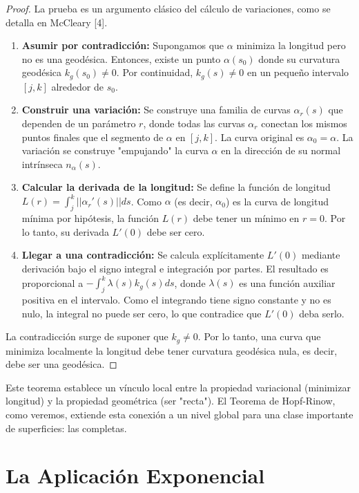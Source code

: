 \documentclass[12pt, a4paper]{report}
\theoremstyle{miestilo}
\theoremstyle{midefinicion}
\begin{document}
\begin{proof}
La prueba es un argumento clásico del cálculo de variaciones, como se detalla en McCleary [4].
\begin{enumerate}
    \item \textbf{Asumir por contradicción:} Supongamos que $\alpha$ minimiza la longitud pero no es una geodésica. Entonces, existe un punto $\alpha(s_0)$ donde su curvatura geodésica $k_g(s_0) \neq 0$. Por continuidad, $k_g(s) \neq 0$ en un pequeño intervalo $[j,k]$ alrededor de $s_0$.
    \item \textbf{Construir una variación:} Se construye una familia de curvas $\alpha_r(s)$ que dependen de un parámetro $r$, donde todas las curvas $\alpha_r$ conectan los mismos puntos finales que el segmento de $\alpha$ en $[j,k]$. La curva original es $\alpha_0 = \alpha$. La variación se construye "empujando" la curva $\alpha$ en la dirección de su normal intrínseca $n_\alpha(s)$.
    \item \textbf{Calcular la derivada de la longitud:} Se define la función de longitud $L(r) = \int_j^k ||\alpha_r'(s)|| ds$. Como $\alpha$ (es decir, $\alpha_0$) es la curva de longitud mínima por hipótesis, la función $L(r)$ debe tener un mínimo en $r=0$. Por lo tanto, su derivada $L'(0)$ debe ser cero.
    \item \textbf{Llegar a una contradicción:} Se calcula explícitamente $L'(0)$ mediante derivación bajo el signo integral e integración por partes. El resultado es proporcional a $-\int_j^k \lambda(s) k_g(s) ds$, donde $\lambda(s)$ es una función auxiliar positiva en el intervalo. Como el integrando tiene signo constante y no es nulo, la integral no puede ser cero, lo que contradice que $L'(0)$ deba serlo.
\end{enumerate}
La contradicción surge de suponer que $k_g \neq 0$. Por lo tanto, una curva que minimiza localmente la longitud debe tener curvatura geodésica nula, es decir, debe ser una geodésica.
\end{proof}

Este teorema establece un vínculo local entre la propiedad variacional (minimizar longitud) y la propiedad geométrica (ser "recta"). El Teorema de Hopf-Rinow, como veremos, extiende esta conexión a un nivel global para una clase importante de superficies: las completas.

\chapter{La Aplicación Exponencial}
\end{document}
